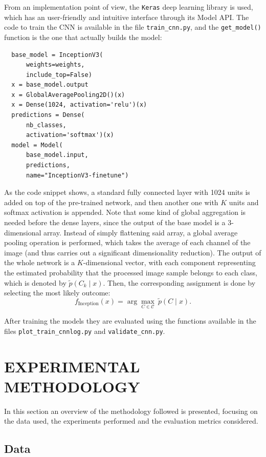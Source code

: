 \documentclass[letterpaper, 10 pt, conference]{IEEEtran}
\begin{document}
From an implementation point of view, the \texttt{Keras} deep learning library \cite{keras} is used, which has an user-friendly and intuitive interface through its Model API. The code to train the CNN is available in the file \texttt{train\_cnn.py}, and the \texttt{get\_model()} function is the one that actually builds the model:

\begin{verbatim}
  base_model = InceptionV3(
      weights=weights,
      include_top=False)
  x = base_model.output
  x = GlobalAveragePooling2D()(x)
  x = Dense(1024, activation='relu')(x)
  predictions = Dense(
      nb_classes,
      activation='softmax')(x)
  model = Model(
      base_model.input,
      predictions,
      name="InceptionV3-finetune")
\end{verbatim}

As the code snippet shows, a standard fully connected layer with 1024 units is added on top of the pre-trained network, and then another one with $K$ units and softmax activation is appended. Note that some kind of global aggregation is needed before the dense layers, since the output of the base model is a 3-dimensional array. Instead of simply flattening said array, a global average pooling operation is performed, which takes the average of each channel of the image (and thus carries out a significant dimensionality reduction). The output of the whole network is a $K$-dimensional vector, with each component representing the estimated probability that the processed image sample belongs to each class, which is denoted by $\tilde p(C_k\mid x)$. Then, the corresponding assignment is done by selecting the most likely outcome:
\[
f_{\text{Inception}}(x) = \arg \max_{C\in\mathcal C} \ \tilde p(C\mid x).
\]

After training the models they are evaluated using the functions available in the files \texttt{plot\_train\_cnnlog.py} and \texttt{validate\_cnn.py}.

\section{EXPERIMENTAL METHODOLOGY}
\label{sec:methodology}

In this section an overview of the methodology followed is presented, focusing on the data used, the experiments performed and the evaluation metrics considered.
\subsection{Data}
\end{document}
